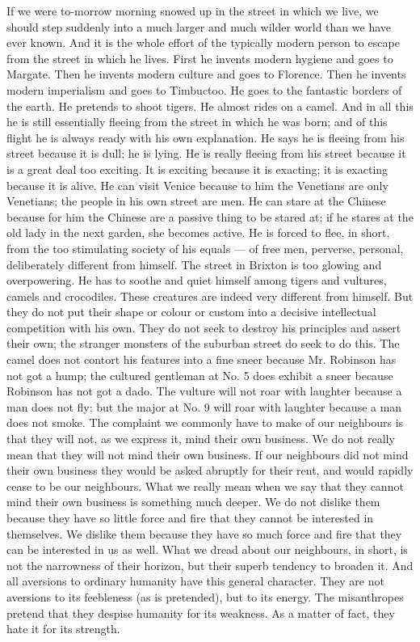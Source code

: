 If we were to-morrow morning snowed up in the street in which we live, we should step suddenly into a much larger and much wilder world than we have ever known. And it is the whole effort of the typically modern person to escape from the street in which he lives. First he invents modern hygiene and goes to Margate. Then he invents modern culture and goes to Florence. Then he invents modern imperialism and goes to Timbuctoo. He goes to the fantastic borders of the earth. He pretends to shoot tigers. He almost rides on a camel. And in all this he is still essentially fleeing from the street in which he was born; and of this flight he is always ready with his own explanation. He says he is fleeing from his street because it is dull; he is lying. He is really fleeing from his street because it is a great deal too exciting. It is exciting because it is exacting; it is exacting because it is alive. He can visit Venice because to him the Venetians are only Venetians; the people in his own street are men. He can stare at the Chinese because for him the Chinese are a passive thing to be stared at; if he stares at the old lady in the next garden, she becomes active. He is forced to flee, in short, from the too stimulating society of his equals — of free men, perverse, personal, deliberately different from himself. The street in Brixton is too glowing and overpowering. He has to soothe and quiet himself among tigers and vultures, camels and crocodiles. These creatures are indeed very different from himself. But they do not put their shape or colour or custom into a decisive intellectual competition with his own. They do not seek to destroy his principles and assert their own; the stranger monsters of the suburban street do seek to do this. The camel does not contort his features into a fine sneer because Mr. Robinson has not got a hump; the cultured gentleman at No. 5 does exhibit a sneer because Robinson has not got a dado. The vulture will not roar with laughter because a man does not fly; but the major at No. 9 will roar with laughter because a man does not smoke. The complaint we commonly have to make of our neighbours is that they will not, as we express it, mind their own business. We do not really mean that they will not mind their own business. If our neighbours did not mind their own business they would be asked abruptly for their rent, and would rapidly cease to be our neighbours. What we really mean when we say that they cannot mind their own business is something much deeper. We do not dislike them because they have so little force and fire that they cannot be interested in themselves. We dislike them because they have so much force and fire that they can be interested in us as well. What we dread about our neighbours, in short, is not the narrowness of their horizon, but their superb tendency to broaden it. And all aversions to ordinary humanity have this general character. They are not aversions to its feebleness (as is pretended), but to its energy. The misanthropes pretend that they despise humanity for its weakness. As a matter of fact, they hate it for its strength.

